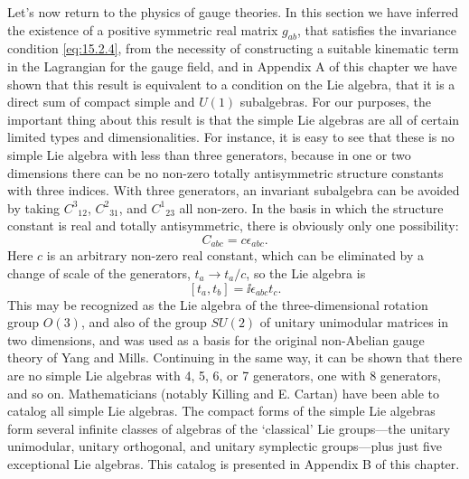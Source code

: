 Let's now return to the physics of gauge theories. In this section we have
inferred the existence of a positive symmetric real matrix $g_{ab}$,
that satisfies the invariance condition \eqref{eq:15.2.4}, from the necessity of
constructing a suitable kinematic term in the Lagrangian for the gauge field, and
in Appendix A of this chapter we have shown that this result is equivalent to a
condition on the Lie algebra, that it is a direct sum of compact simple and
$U(1)$ subalgebras. For our purposes, the important thing about this result is
that the simple Lie algebras are all of certain limited types and dimensionalities.
For instance, it is easy to see that these is no simple Lie algebra with less than
three generators, because in one or two dimensions there can be no non-zero
totally antisymmetric structure constants with three indices. With three
generators, an invariant subalgebra can be avoided by taking $C^3{}_{12}$,
$C^2{}_{31}$, and $C^1{}_{23}$ all non-zero. In the basis in which the structure
constant is real and totally antisymmetric, there is obviously only one
possibility:
\[
 C_{abc}=c\epsilon_{abc} .
\]
Here $c$ is an arbitrary non-zero real constant, which can be eliminated by a
change of scale of the generators, $t_a\longrightarrow t_a/c$, so the
Lie algebra is
\[
 [t_a,t_b]=\ii\epsilon_{abc}t_c .
\]
This may be recognized as the Lie algebra of the three-dimensional rotation group
$O(3)$, and also of the group $SU(2)$ of unitary unimodular matrices in two
dimensions, and was used as a basis for the original non-Abelian gauge theory of
Yang and Mills. Continuing in the same way, it can be shown that there are no
simple Lie algebras with 4, 5, 6, or 7 generators, one with 8 generators, and so
on. Mathematicians (notably Killing and E. Cartan) have been able to catalog all
simple Lie algebras. The compact forms of the simple Lie algebras form several
infinite classes of algebras of the `classical' Lie groups---the unitary
unimodular, unitary orthogonal, and unitary symplectic groups---plus just five
exceptional Lie algebras. This catalog is presented in Appendix B of this chapter.

